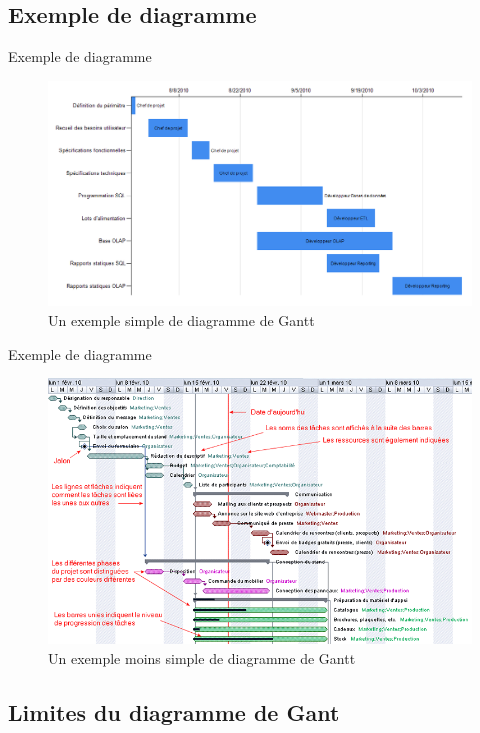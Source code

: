 \documentclass[handout]{beamer}
\begin{document}
\subsection{Exemple de diagramme}
\begin{frame}{Exemple de diagramme}
    \begin{figure}
    \centering
    \includegraphics[scale=0.40]{gantt.png}
    \caption{Un exemple simple de diagramme de Gantt}
    \label{fig:Gantt1}
    \end{figure}
\end{frame}


\begin{frame}{Exemple de diagramme}
    \begin{figure}
    \centering
    \includegraphics[scale=0.35]{gantt2.png}
    \caption{Un exemple moins simple de diagramme de Gantt}
    \label{fig:Gantt2}
    \end{figure}
\end{frame}

\subsection{Limites du diagramme de Gant}
\end{document}
